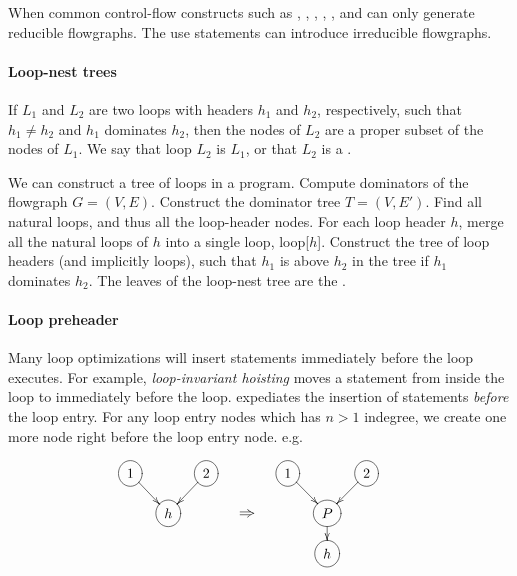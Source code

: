 \documentclass{memo}
\begin{document}
When common control-flow constructs such as , ,
, , , and  can only generate
reducible flowgraphs. The use  statements can introduce irreducible
flowgraphs. 


\paragraph{Loop-nest trees}
If $L_1$ and $L_2$ are two loops with headers $h_1$ and $h_2$, respectively,
such that $h_1 \ne h_2$ and $h_1$ dominates $h_2$, then the nodes of $L_2$ are
a proper subset of the nodes of $L_1$. We say that loop $L_2$ is  $L_1$, or that $L_2$ is a . 

We can construct a  tree of loops in a program. 
\bit
\w Compute dominators of the flowgraph $G = (V, E)$. 
\w Construct the dominator tree $T = (V, E')$.
\w Find all natural loops, and thus all the loop-header nodes.
\w For each loop header $h$, merge all the natural loops of $h$ into a single
loop, loop[$h$]. 
\w Construct the tree of loop headers (and implicitly loops), such that $h_1$
is above $h_2$ in the tree if $h_1$ dominates $h_2$.
\eit
The leaves of the loop-nest tree are the . 


\paragraph{Loop preheader}
Many loop optimizations will insert statements immediately before the loop
executes. For example, {\em loop-invariant hoisting\/}  moves a statement from
inside the loop to immediately before the loop. 
 expediates the insertion of statements {\em before\/} the
loop entry.  For any loop entry nodes which has $n > 1$ indegree, we create
one more node right before the loop entry node. e.g.

\[\xymatrix@-0.5cm{
  *++[o][F]{1} \ar[rd] & &*++[o][F]{2} \ar[ld] & & &  *++[o][F]{1} \ar[rd] & &*++[o][F]{2} \ar[ld] \\ 
   & *++[o][F]{h} & & \ar@{=>}[r]& &&*++[o][F]{P} \ar[d] & \\
   &  && &&&*++[o][F]{h} &&
}\]
\end{document}
